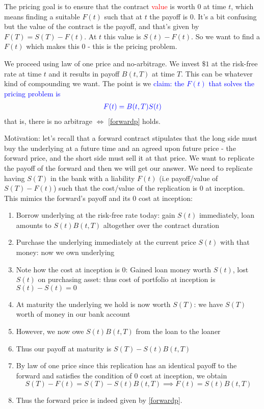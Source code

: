 \documentclass[9pt]{extarticle}
\begin{document}
The pricing goal is to ensure that the contract \textcolor{red}{value} is worth $0$ 
at time $t$, which means finding a suitable $F(t)$ such that at $t$ the payoff is $0$. It's a 
bit confusing but the value of the contract is the payoff, and that's given by 
$F(T)=S(T)-F(t)$. At $t$ this value is $S(t)-F(t)$. So 
we want to find a $F(t)$ which makes this 0 - this is the pricing problem.


We proceed using law of one price and no-arbitrage. We invest $\$1$ at the 
risk-free rate at time $t$ and it results in payoff $B(t,T)$ at time $T$. This 
can be whatever kind of compounding we want. The point is we \textcolor{blue}{claim:
the $F(t)$ that solves the pricing problem is} 
\begin{align}\label{forwardp}
  \textcolor{blue}{F(t) = B(t,T)S(t)} 
\end{align}
that is, there is no arbitrage $\iff$ \eqref{forwardp} holds.

Motivation: let's recall that a forward contract stipulates that the long side must 
buy the underlying at a future time and an agreed upon future price - the forward price, and the short side must sell it at that 
price. We want to replicate the payoff of the forward and then we will get our answer. We need to replicate 
having $S(T)$ in the bank with a liability $F(t)$ (i.e payoff/value of $S(T)-F(t)$) such that the cost/value of the replication is 
0 at inception. This mimics the forward's payoff and its 0 cost at inception:
\begin{enumerate}
  \item Borrow underlying at the risk-free rate today: gain $S(t)$ immediately, loan amounts to $S(t)B(t,T)$ altogether over the contract duration 
  \item Purchase the underlying immediately at the current price $S(t)$ with that money: now we own underlying
  \item Note how the cost at inception is 0: Gained loan money worth $S(t)$, lost $S(t)$ on purchasing asset: thus cost of portfolio at inception is $S(t)-S(t)=0$
  \item At maturity the underlying we hold is now worth $S(T)$: we have $S(T)$ worth of money in our bank account 
  \item However, we now owe $S(t)B(t,T)$ from the loan to the loaner
  \item Thus our payoff at maturity is $S(T)-S(t)B(t,T)$
  \item By law of one price since this replication has an identical payoff to the forward and satisfies the condition of 0 cost at inception, we obtain 
  $$S(T)-F(t) = S(T)-S(t)B(t,T)\implies F(t)= S(t)B(t,T) $$
  \item Thus the forward price is indeed given by \eqref{forwardp}.
\end{enumerate} 
\end{document}
